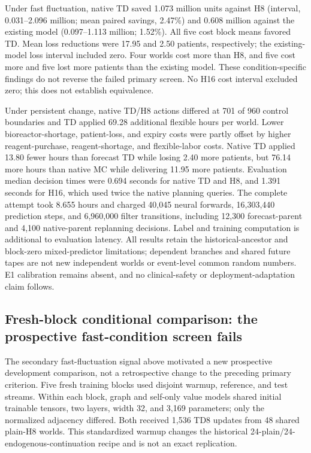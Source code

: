 \documentclass[preprint,review,12pt]{elsarticle}
\begin{document}
Under fast fluctuation, native TD saved 1.073 million units against H8
(interval, 0.031--2.096 million; mean paired savings, 2.47\%) and 0.608 million
against the existing model (0.097--1.113 million; 1.52\%). All five cost block
means favored TD. Mean loss reductions were 17.95 and 2.50 patients, respectively;
the existing-model loss interval included zero. Four worlds cost more than H8,
and five cost more and five lost more patients than the existing model.
These condition-specific findings do not reverse the failed primary screen.
No H16 cost interval excluded zero; this does not establish equivalence.

Under persistent change, native TD/H8 actions differed at 701 of 960 control
boundaries and TD applied 69.28 additional flexible hours per world. Lower
bioreactor-shortage, patient-loss, and expiry costs were partly offset by higher
reagent-purchase, reagent-shortage, and flexible-labor costs. Native TD applied
13.80 fewer hours than forecast TD while losing 2.40 more patients, but 76.14
more hours than native MC while delivering 11.95 more patients. Evaluation
median decision times were 0.694 seconds for native TD and H8, and 1.391 seconds
for H16, which used twice the native planning queries. The complete attempt
took 8.655 hours and charged 40,045 neural forwards, 16,303,440 prediction steps,
and 6,960,000 filter transitions, including 12,300 forecast-parent and 4,100
native-parent replanning decisions. Label and training computation is additional
to evaluation latency. All results retain the historical-ancestor and block-zero
mixed-predictor limitations; dependent branches and shared future tapes are not
new independent worlds or event-level common random numbers. E1 calibration
remains absent, and no clinical-safety or deployment-adaptation claim follows.

\subsection{Fresh-block conditional comparison: the prospective fast-condition screen fails}
\label{sec:fresh-conditional-development}
The secondary fast-fluctuation signal above motivated a new prospective
development comparison, not a retrospective change to the preceding primary
criterion. Five fresh training blocks used disjoint warmup, reference, and
test streams. Within each block, graph and self-only value models shared
initial trainable tensors, two layers, width 32, and 3,169 parameters; only
the normalized adjacency differed. Both received 1,536 TD8 updates from 48
shared plain-H8 worlds. This standardized warmup changes the historical
24-plain/24-endogenous-continuation recipe and is not an exact replication.
\end{document}
